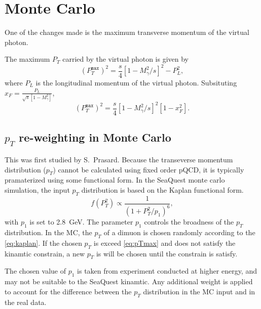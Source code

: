 \documentclass[../main.tex]{subfiles}
\begin{document}
\section{Monte Carlo}
\label{sec:MC}

One of the changes made is the maximum transverse momentum of the virtual photon.

The maximum $P_T$ carried by the virtual photon is given by
\begin{equation}
	\left(P_T^{\mathtt{max}}\right)^2 = \frac{s}{4} \left[1-M^2_\gamma/s\right]^2 - P_L^2,
\end{equation}
where $P_L$ is the longitudinal momentum of the virtual photon.
Subsituting $x_F = \frac{P_L}{\sqrt{s}\left[1-M^2_\gamma\right]}$, 
\begin{equation}
	\left(P_T^{\mathtt{max}}\right)^2 = \frac{s}{4} \left[1-M^2_\gamma/s\right]^2\left[1-x_F^2\right].
	\label{eq:pTmax}
\end{equation}

\subsection{\texorpdfstring{$p_T$}{pT} re-weighting in Monte Carlo}
This was first studied by S.~Prasard.
Because the transeverse momentum distribution ($p_T$) cannot be calculated using
fixed order pQCD, it is typically pramaterized using some functional form.
In the SeaQuest monte carlo simulation, the input $p_T$ distribution is based on the
Kaplan functional form.
\begin{equation}
	f\left(P_T^2\right) \propto \frac{1}{\left(1+ P_T^2/p_1\right)^6},
	\label{eq:kaplan}
\end{equation}
with $p_1$ is set to \SI{2.8}{\GeV}. The parameter $p_1$ controls the broadness
of the $p_T$ distribution. In the MC, the $p_T$ of a dimuon is chosen randomly
according to the \cref{eq:kaplan}. If the chosen $p_T$ is exceed \cref{eq:pTmax}
and does not satisfy the kinamtic constrain, a new $p_T$ is will be chosen until
the constrain is satisfy.

The chosen value of $p_1$ is taken from experiment conducted at higher
energy, and may not be suitable to the SeaQuest kinamtic. Any additional weight is
applied to account for the difference between the $p_T$ distribution in the MC input
and in the real data. 
\end{document}
